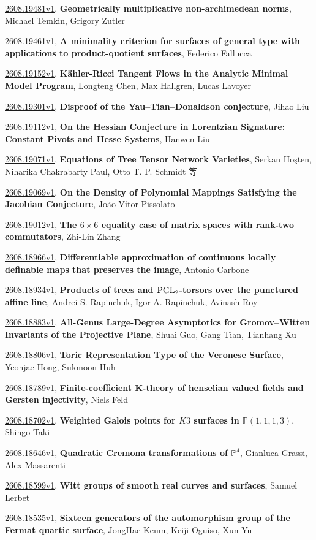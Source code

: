 \documentclass[9pt, a4paper]{article}
\theoremstyle{plain}
\theoremstyle{definition}
\theoremstyle{remark}
\newcommand{\arxiv}[3]{\href{https://arxiv.org/abs/#1}{#1}, \textbf{\textcolor{arxivblue}{#2}}, #3}
\begin{document}
\arxiv{2608.19481v1}{Geometrically multiplicative non-archimedean norms}{Michael Temkin, Grigory Zutler}

\arxiv{2608.19461v1}{A minimality criterion for surfaces of general type with applications to product-quotient surfaces}{Federico Fallucca}

\arxiv{2608.19152v1}{Kähler-Ricci Tangent Flows in the Analytic Minimal Model Program}{Longteng Chen, Max Hallgren, Lucas Lavoyer}

\arxiv{2608.19301v1}{Disproof of the Yau--Tian--Donaldson conjecture}{Jihao Liu}

\arxiv{2608.19112v1}{On the Hessian Conjecture in Lorentzian Signature: Constant Pivots and Hesse Systems}{Hanwen Liu}

\arxiv{2608.19071v1}{Equations of Tree Tensor Network Varieties}{Serkan Hoşten, Niharika Chakrabarty Paul, Otto T. P. Schmidt 等}

\arxiv{2608.19069v1}{On the Density of Polynomial Mappings Satisfying the Jacobian Conjecture}{João Vítor Pissolato}

\arxiv{2608.19012v1}{The $6\times6$ equality case of matrix spaces with rank-two commutators}{Zhi-Lin Zhang}

\arxiv{2608.18966v1}{Differentiable approximation of continuous locally definable maps that preserves the image}{Antonio Carbone}

\arxiv{2608.18934v1}{Products of trees and ${\rm PGL}_2$-torsors over the punctured affine line}{Andrei S. Rapinchuk, Igor A. Rapinchuk, Avinash Roy}

\arxiv{2608.18883v1}{All-Genus Large-Degree Asymptotics for Gromov--Witten Invariants of the Projective Plane}{Shuai Guo, Gang Tian, Tianhang Xu}

\arxiv{2608.18806v1}{Toric Representation Type of the Veronese Surface}{Yeonjae Hong, Sukmoon Huh}

\arxiv{2608.18789v1}{Finite-coefficient K-theory of henselian valued fields and Gersten injectivity}{Niels Feld}

\arxiv{2608.18702v1}{Weighted Galois points for $K3$ surfaces in $\mathbb{P}(1,1,1, 3)$}{Shingo Taki}

\arxiv{2608.18646v1}{Quadratic Cremona transformations of $\mathbb{P}^4$}{Gianluca Grassi, Alex Massarenti}

\arxiv{2608.18599v1}{Witt groups of smooth real curves and surfaces}{Samuel Lerbet}

\arxiv{2608.18535v1}{Sixteen generators of the automorphism group of the Fermat quartic surface}{JongHae Keum, Keiji Oguiso, Xun Yu}
\end{document}

